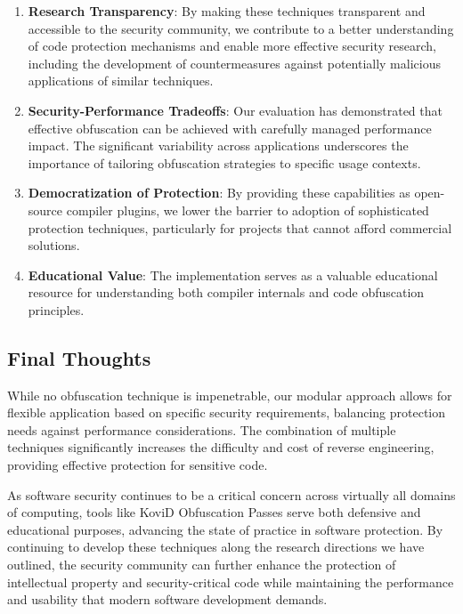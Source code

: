 \documentclass[conference]{IEEEtran}
\begin{document}
\begin{enumerate}
    \item \textbf{Research Transparency}: By making these techniques transparent and accessible to the security community, we contribute to a better understanding of code protection mechanisms and enable more effective security research, including the development of countermeasures against potentially malicious applications of similar techniques.
    
    \item \textbf{Security-Performance Tradeoffs}: Our evaluation has demonstrated that effective obfuscation can be achieved with carefully managed performance impact. The significant variability across applications underscores the importance of tailoring obfuscation strategies to specific usage contexts.
    
    \item \textbf{Democratization of Protection}: By providing these capabilities as open-source compiler plugins, we lower the barrier to adoption of sophisticated protection techniques, particularly for projects that cannot afford commercial solutions.
    
    \item \textbf{Educational Value}: The implementation serves as a valuable educational resource for understanding both compiler internals and code obfuscation principles.
\end{enumerate}

\subsection{Final Thoughts}
While no obfuscation technique is impenetrable, our modular approach allows for flexible application based on specific security requirements, balancing protection needs against performance considerations. The combination of multiple techniques significantly increases the difficulty and cost of reverse engineering, providing effective protection for sensitive code.

As software security continues to be a critical concern across virtually all domains of computing, tools like KoviD Obfuscation Passes serve both defensive and educational purposes, advancing the state of practice in software protection. By continuing to develop these techniques along the research directions we have outlined, the security community can further enhance the protection of intellectual property and security-critical code while maintaining the performance and usability that modern software development demands.
\end{document}

